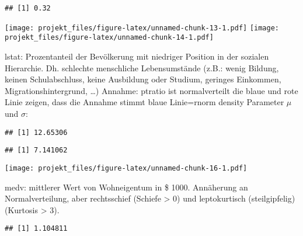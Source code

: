 \documentclass[]{article}
\newenvironment{Shaded}{\begin{snugshade}}{\end{snugshade}}
\newcommand{\KeywordTok}[1]{\textcolor[rgb]{0.13,0.29,0.53}{\textbf{#1}}}
\newcommand{\OperatorTok}[1]{\textcolor[rgb]{0.81,0.36,0.00}{\textbf{#1}}}
\newcommand{\NormalTok}[1]{#1}
\begin{document}
\begin{verbatim}
## [1] 0.32
\end{verbatim}

\texttt{[image: projekt\_files/figure-latex/unnamed-chunk-13-1.pdf]}
\texttt{[image: projekt\_files/figure-latex/unnamed-chunk-14-1.pdf]}

lstat: Prozentanteil der Bevölkerung mit niedriger Position in der
sozialen Hierarchie. Dh. schlechte menschliche Lebensumstände (z.B.:
wenig Bildung, keinen Schulabschluss, keine Ausbildung oder Studium,
geringes Einkommen, Migrationshintergrund, \ldots{}) Annahme: ptratio
ist normalverteilt die blaue und rote Linie zeigen, dass die Annahme
stimmt blaue Linie=rnorm density Parameter \(\mu\) und \(\sigma\):

\begin{Shaded}
\end{Shaded}

\begin{verbatim}
## [1] 12.65306
\end{verbatim}

\begin{Shaded}
\end{Shaded}

\begin{verbatim}
## [1] 7.141062
\end{verbatim}

\texttt{[image: projekt\_files/figure-latex/unnamed-chunk-16-1.pdf]}

medv: mittlerer Wert von Wohneigentum in \$ 1000. Annäherung an
Normalverteilung, aber rechtsschief (Schiefe \textgreater{} 0) und
leptokurtisch (steilgipfelig) (Kurtosis \textgreater{} 3).

\begin{Shaded}
\end{Shaded}

\begin{verbatim}
## [1] 1.104811
\end{verbatim}
\end{document}
